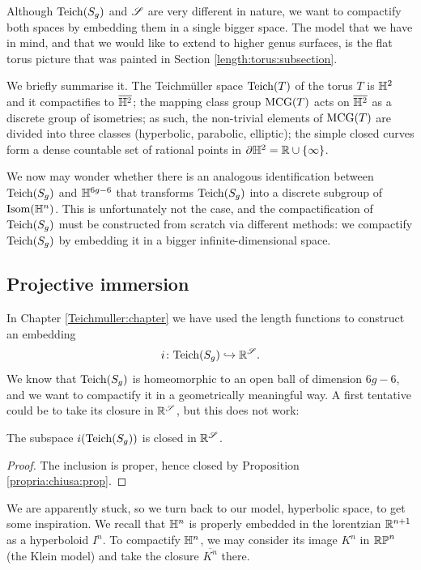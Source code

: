 Although ${\rm Teich}(S_g)$ and $\mathscr{S}$ are very different in nature, we want to compactify both spaces by embedding them in a single bigger space. The model that we have in mind, and that we would like to extend to higher genus surfaces, is the flat torus picture that was painted in Section \ref{length:torus:subsection}. 

We briefly summarise it. The Teichm\"uller space ${\rm Teich}(T)$ of the torus $T$ is $\mathbb{H}^2$ and it compactifies to $\overline {\mathbb{H}^2}$; the mapping class group ${\rm MCG}(T)$ acts on $\overline {\mathbb{H}^2}$ as a discrete group of isometries; as such, the non-trivial elements of ${\rm MCG}(T)$ are divided into three classes (hyperbolic, parabolic, elliptic); the simple closed curves form a dense countable set of rational points in $\partial \mathbb{H}^2 = \mathbb{R}\cup \{\infty\}$.

We now may wonder whether there is an analogous identification between ${\rm Teich}(S_g)$ and $\mathbb{H}^{6g-6}$ that transforms ${\rm Teich}(S_g)$ into a discrete subgroup of ${\rm Isom}(\mathbb{H}^n)$. This is unfortunately not the case, and the compactification of ${\rm Teich}(S_g)$ must be constructed from scratch via different methods: we compactify ${\rm Teich}(S_g)$ by embedding it in a bigger infinite-dimensional space.

\subsection{Projective immersion} \label{projective:immersion:subsection}
In Chapter  \ref{Teichmuller:chapter} we have used the length functions to construct an embedding
$$i\colon {\rm Teich}(S_g) \hookrightarrow \mathbb{R}^\mathscr{S}.$$
We know that ${\rm Teich}(S_g)$ is homeomorphic to an open ball of dimension $6g-6$, and we want to compactify it in a geometrically meaningful way. A first tentative could be to take its closure in $\mathbb{R}^\mathscr{S}$, but this does not work:

\begin{prop}
The subspace $i({\rm Teich}(S_g))$ is closed in $\mathbb{R}^\mathscr{S}$.
\end{prop}
\begin{proof}
The inclusion is proper, hence closed by Proposition \ref{propria:chiusa:prop}.
\end{proof}

We are apparently stuck, so we turn back to our model, hyperbolic space, to get some inspiration. We recall that $\mathbb{H}^n$ is properly embedded in the lorentzian $\mathbb{R}^{n+1}$ as a hyperboloid $I^n$. To compactify $\mathbb{H}^n$, we may consider its image $K^n$ in $\mathbb{RP}^n$ (the Klein model) and take the closure $\overline{K^n}$ there.

